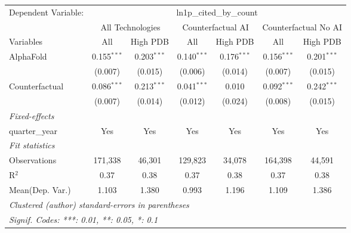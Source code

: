 \begingroup
\centering
\begin{tabular}{lcccccc}
   \tabularnewline \midrule \midrule
   Dependent Variable: & \multicolumn{6}{c}{ln1p\_cited\_by\_count}\\
 & \multicolumn{2}{c}{All Technologies} & \multicolumn{2}{c}{Counterfactual AI} & \multicolumn{2}{c}{Counterfactual No AI} \\
\cmidrule(lr){1-1}\cmidrule(lr){2-3} \cmidrule(lr){4-5} \cmidrule(lr){6-7}
Variables & \multicolumn{1}{c}{All} & \multicolumn{1}{c}{High PDB} & \multicolumn{1}{c}{All} & \multicolumn{1}{c}{High PDB} & \multicolumn{1}{c}{All} & \multicolumn{1}{c}{High PDB} \\
\cmidrule(lr){1-1}\cmidrule(lr){2-2} \cmidrule(lr){3-3} \cmidrule(lr){4-4} \cmidrule(lr){5-5} \cmidrule(lr){6-6} \cmidrule(lr){7-7}
   AlphaFold      & 0.155$^{***}$ & 0.203$^{***}$ & 0.140$^{***}$ & 0.176$^{***}$ & 0.156$^{***}$ & 0.201$^{***}$\\   
                  & (0.007)       & (0.015)       & (0.006)       & (0.014)       & (0.007)       & (0.015)\\   
   Counterfactual & 0.086$^{***}$ & 0.213$^{***}$ & 0.041$^{***}$ & 0.010         & 0.092$^{***}$ & 0.242$^{***}$\\   
                  & (0.007)       & (0.014)       & (0.012)       & (0.024)       & (0.008)       & (0.015)\\   
   \midrule
   \emph{Fixed-effects}\\
   quarter\_year  & Yes           & Yes           & Yes           & Yes           & Yes           & Yes\\  
   \midrule
   \emph{Fit statistics}\\
   Observations   & 171,338       & 46,301        & 129,823       & 34,078        & 164,398       & 44,591\\  
   R$^2$          & 0.37          & 0.38          & 0.37          & 0.38          & 0.37          & 0.38\\  
Mean(Dep. Var.) & 1.103 & 1.380 & 0.993 & 1.196 & 1.109 & 1.386 \\
   \midrule \midrule
   \multicolumn{7}{l}{\emph{Clustered (author) standard-errors in parentheses}}\\
   \multicolumn{7}{l}{\emph{Signif. Codes: ***: 0.01, **: 0.05, *: 0.1}}\\
\end{tabular}
\par\endgroup
